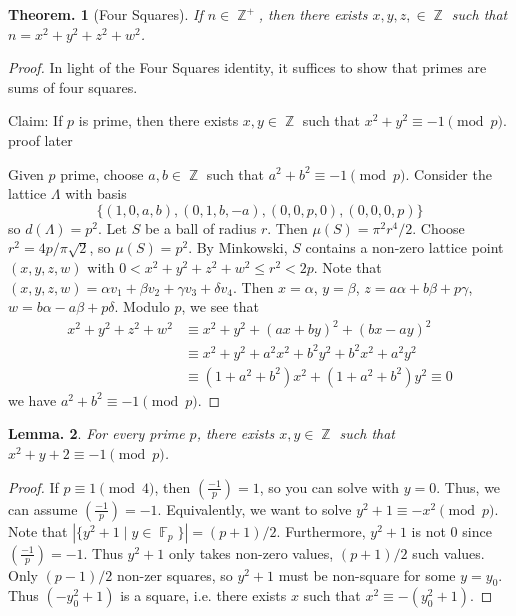 \documentclass[11pt, a4paper]{memoir}
\DeclareMathOperator{\Z}{{\mathbb{Z}}}
\DeclareMathOperator{\F}{{\mathbb{F}}}
\theoremstyle{change}
\newtheorem{theorem}{Theorem.}[section]
\newtheorem{lemma}[theorem]{Lemma.}
\theoremstyle{plain}
\theoremstyle{nonumberplain}
\newtheorem{proof}{Proof}
\newcommand{\lgs}[2]{\ensuremath{\left(\frac{#1}{#2}\right)}}
\begin{document}
\begin{theorem}[Four Squares]
    If $n\in\Z^+$, then there exists $x,y,z,\in\Z$ such that $n=x^2+y^2+z^2+w^2$.
\end{theorem}
\begin{proof}
    In light of the Four Squares identity, it suffices to show that primes are sums of four squares.

    Claim: If $p$ is prime, then there exists $x,y\in\Z$ such that $x^2+y^2\equiv -1\pmod{p}$.
    proof later

    Given $p$ prime, choose $a,b\in\Z$ such that $a^2+b^2\equiv -1\pmod{p}$.
    Consider the lattice $\Lambda$ with basis
    \begin{equation*}
        \{(1,0,a,b),(0,1,b,-a),(0,0,p,0),(0,0,0,p)\}
    \end{equation*}
    so $d(\Lambda)=p^2$.
    Let $S$ be a ball of radius $r$.
    Then $\mu(S)=\pi^2r^4/2$.
    Choose $r^2=4p/\pi\sqrt{2}$, so $\mu(S)=p^2$.
    By Minkowski, $S$ contains a non-zero lattice point $(x,y,z,w)$ with $0<x^2+y^2+z^2+w^2\leq r^2<2p$.
    Note that $(x,y,z,w)=\alpha v_1+\beta v_2+\gamma v_3+\delta v_4$.
    Then $x=\alpha$, $y=\beta$, $z=a\alpha+b\beta+p\gamma$, $w=b\alpha-a\beta+p\delta$.
    Modulo $p$, we see that
    \begin{align*}
        x^2+y^2+z^2+w^2 &\equiv x^2+y^2+(ax+by)^2+(bx-ay)^2\\
                        &\equiv x^2+y^2+a^2x^2+b^2y^2+b^2x^2+a^2y^2\\
                        &\equiv (1+a^2+b^2)x^2+(1+a^2+b^2)y^2\equiv 0
    \end{align*}
    we have $a^2+b^2\equiv -1\pmod{p}$.
\end{proof}
\begin{lemma}
    For every prime $p$, there exists $x,y\in\Z$ such that $x^2+y+2\equiv -1\pmod{p}$.
\end{lemma}
\begin{proof}
    If $p\equiv 1\pmod{4}$, then $\lgs{-1}{p}=1$, so you can solve with $y=0$.
    Thus, we can assume $\lgs{-1}{p}=-1$.
    Equivalently, we want to solve $y^2+1\equiv -x^2\pmod{p}$.
    Note that $|\{y^2+1\mid y\in\F_p\}|=(p+1)/2$.
    Furthermore, $y^2+1$ is not $0$ since $\lgs{-1}{p}=-1$.
    Thus $y^2+1$ only takes non-zero values, $(p+1)/2$ such values.
    Only $(p-1)/2$ non-zer squares, so $y^2+1$ must be non-square for some $y=y_0$.
    Thus $(-y_0^2+1)$ is a square, i.e. there exists $x$ such that $x^2\equiv-(y_0^2+1)$.
\end{proof}
\end{document}
